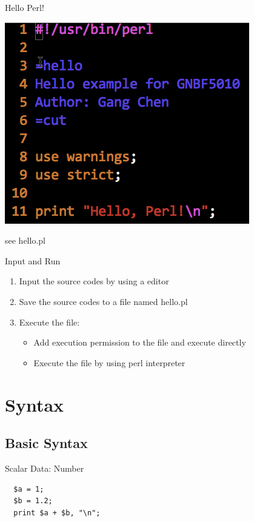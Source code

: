 \documentclass[UTF8]{beamer}
\begin{document}
\begin{frame}[t]{Hello Perl!}
  \centerline{\includegraphics[height=.6\textheight]{hello.png}}
  see hello.pl
\end{frame}

\begin{frame}[t]{Input and Run}
  \begin{enumerate}
    \item Input the source codes by using a editor
    \item Save the source codes to a file named hello.pl
    \item Execute the file:
    \begin{itemize}
      \item Add execution permission to the file and execute directly
      \item Execute the file by using perl interpreter
    \end{itemize}
  \end{enumerate}
\end{frame}

\section{Syntax}

\subsection{Basic Syntax}
\begin{frame}[fragile]{Scalar Data: Number}
\begin{verbatim}
  $a = 1;
  $b = 1.2;
  print $a + $b, "\n";
\end{verbatim}
\end{frame}
\end{document}
